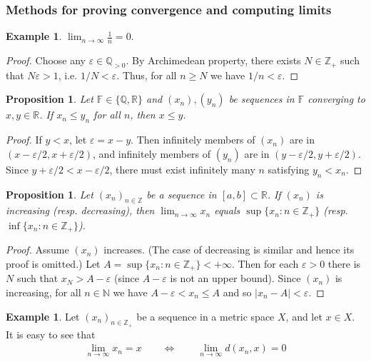 \documentclass[12pt,b5paper,notitlepage]{article}
\theoremstyle{definition}
\newtheorem{eg}[df]{Example}
\theoremstyle{plain}
\newtheorem{pp}[df]{Proposition}
\newcommand{\Nbb}{\mathbb N}
\newcommand{\Zbb}{\mathbb Z}
\newcommand{\Qbb}{\mathbb Q}
\newcommand{\Rbb}{\mathbb R}
\newcommand{\Fbb}{\mathbb F}
\newcommand{\dps}{\displaystyle}
\newcommand{\eps}{\varepsilon}
\numberwithin{equation}{section}
\begin{document}
\subsubsection{Methods for proving convergence and computing limits}

\begin{eg}
$\dps \lim_{n\rightarrow\infty}\frac 1n=0$.
\end{eg}


\begin{proof}
Choose any $\varepsilon\in\Qbb_{>0}$. By Archimedean property, there exists $N\in\Zbb_+$ such that $N\varepsilon>1$, i.e. $1/N<\varepsilon$. Thus, for all $n\geq N$ we have $1/n<\varepsilon$.
\end{proof}

\begin{pp}
Let $\Fbb\in\{\Qbb,\Rbb\}$ and $(x_n),(y_n)$ be sequences in $\Fbb$ converging to $x,y\in\Rbb$. If $x_n\leq y_n$ for all $n$, then $x\leq y$.
\end{pp}

\begin{proof}
If $y<x$, let $\varepsilon=x-y$. Then infinitely members of $(x_n)$ are in $(x-\varepsilon/2,x+\varepsilon/2)$, and infinitely members of $(y_n)$ are in $(y-\varepsilon/2,y+\varepsilon/2)$. Since $y+\eps/2<x-\eps/2$, there must exist infinitely many $n$ satisfying $y_n<x_n$.
\end{proof}

\begin{pp}\label{lb57}
Let $(x_n)_{n\in\Zbb}$ be a sequence in $[a,b]\subset\Rbb$. If $(x_n)$ is increasing (resp. decreasing), then $\dps\lim_{n\rightarrow \infty}x_n$ equals $\dps\sup\{x_n:n\in\Zbb_+\}$ (resp. $\dps\inf\{x_n:n\in\Zbb_+\}$).
\end{pp}

\begin{proof}
Assume $(x_n)$ increases. (The case of decreasing is similar and hence its proof is omitted.) Let $A=\sup\{x_n:n\in\Zbb_+\}<+\infty$. Then for each $\eps>0$ there is $N$ such that $x_N>A-\eps$ (since $A-\eps$ is not an upper bound). Since $(x_n)$ is increasing, for all $n\in\Nbb$ we have $A-\eps<x_n\leq A$ and so $|x_n-A|<\eps$.
\end{proof}



\begin{eg}\label{lb27}
Let $(x_n)_{n\in\Zbb_+}$ be a sequence in a metric space $X$, and let $x\in X$. It is easy to see that
\begin{align*}
\lim_{n\rightarrow\infty} x_n=x\qquad\Longleftrightarrow \qquad \lim_{n\rightarrow\infty} d(x_n,x)=0
\end{align*}
\end{eg}
\end{document}
